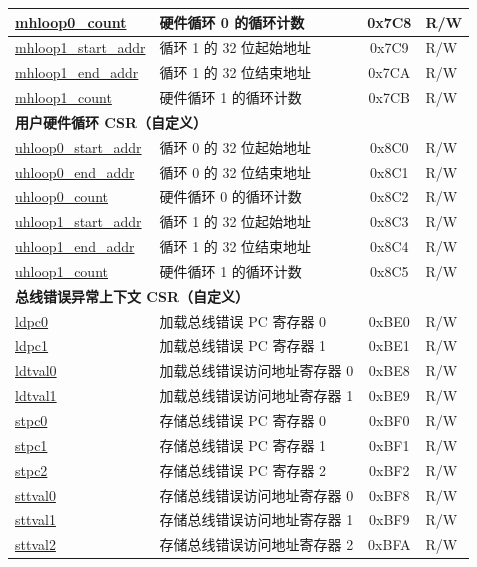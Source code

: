 \begin{longtable}{ | p{4.0cm} | p{8.4cm} | c | l | }
\hyperref[sec:riscvcpu-hwloop-reg-desc]{mhloop0\_count} & 硬件循环 0 的循环计数 & 0x7C8 & R/W \\\hline
\hyperref[sec:riscvcpu-hwloop-reg-desc]{mhloop1\_start\_addr} & 循环 1 的 32 位起始地址 & 0x7C9 & R/W \\\hline
\hyperref[sec:riscvcpu-hwloop-reg-desc]{mhloop1\_end\_addr} & 循环 1 的 32 位结束地址 & 0x7CA & R/W \\\hline
\hyperref[sec:riscvcpu-hwloop-reg-desc]{mhloop1\_count} & 硬件循环 1 的循环计数 & 0x7CB & R/W \\\hline
\multicolumn{4}{|l|}{\textbf{用户硬件循环 CSR（自定义）}} \\\hline
\hyperref[sec:riscvcpu-hwloop-reg-desc]{uhloop0\_start\_addr} & 循环 0 的 32 位起始地址 & 0x8C0 & R/W \\\hline
\hyperref[sec:riscvcpu-hwloop-reg-desc]{uhloop0\_end\_addr} & 循环 0 的 32 位结束地址 & 0x8C1 & R/W \\\hline
\hyperref[sec:riscvcpu-hwloop-reg-desc]{uhloop0\_count} & 硬件循环 0 的循环计数 & 0x8C2 & R/W \\\hline
\hyperref[sec:riscvcpu-hwloop-reg-desc]{uhloop1\_start\_addr} & 循环 1 的 32 位起始地址 & 0x8C3 & R/W \\\hline
\hyperref[sec:riscvcpu-hwloop-reg-desc]{uhloop1\_end\_addr} & 循环 1 的 32 位结束地址 & 0x8C4 & R/W \\\hline
\hyperref[sec:riscvcpu-hwloop-reg-desc]{uhloop1\_count} & 硬件循环 1 的循环计数 & 0x8C5 & R/W \\\hline
\multicolumn{4}{|l|}{\textbf{总线错误异常上下文 CSR（自定义）}} \\\hline
\hyperref[regdesc:LDPC0]{ldpc0} & 加载总线错误 PC 寄存器 0 & 0xBE0 & R/W \\\hline
\hyperref[regdesc:LDPC1]{ldpc1} & 加载总线错误 PC 寄存器 1 & 0xBE1 & R/W \\\hline
\hyperref[regdesc:LDTVAL0]{ldtval0} & 加载总线错误访问地址寄存器 0 & 0xBE8 & R/W \\\hline
\hyperref[regdesc:LDTVAL1]{ldtval1} & 加载总线错误访问地址寄存器 1 & 0xBE9 & R/W \\\hline
\hyperref[regdesc:STPC0]{stpc0} & 存储总线错误 PC 寄存器 0 & 0xBF0 & R/W \\\hline
\hyperref[regdesc:STPC1]{stpc1} & 存储总线错误 PC 寄存器 1 & 0xBF1 & R/W \\\hline
\hyperref[regdesc:STPC2]{stpc2} & 存储总线错误 PC 寄存器 2 & 0xBF2 & R/W \\\hline
\hyperref[regdesc:STTVAL0]{sttval0} & 存储总线错误访问地址寄存器 0 & 0xBF8 & R/W \\\hline
\hyperref[regdesc:STTVAL1]{sttval1} & 存储总线错误访问地址寄存器 1 & 0xBF9 & R/W \\\hline
\hyperref[regdesc:STTVAL2]{sttval2} & 存储总线错误访问地址寄存器 2 & 0xBFA & R/W \\\hline
\end{longtable}
